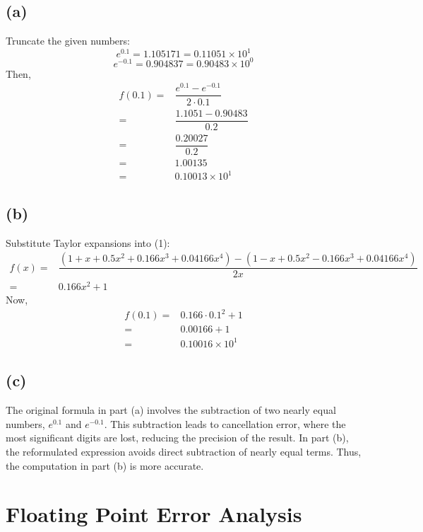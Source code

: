 \documentclass{article}
\begin{document}
\subsection*{(a)}
Truncate the given numbers:
$$
    e^{0.1} = 1.105171 = 0.11051 \times 10^1
$$
$$
    e^{-0.1} = 0.904837 = 0.90483 \times 10^0
$$
Then,
\begin{equation*}
    \begin{aligned}
        f(0.1) = & \dfrac{e^{0.1} - e^{-0.1}}{2 \cdot 0.1} \\
        =        & \dfrac{1.1051-0.90483}{0.2}             \\
        =        & \dfrac{0.20027}{0.2}                    \\
        =        & 1.00135                                 \\
        =        & \boxed{0.10013 \times 10^1}
    \end{aligned}
\end{equation*}

\subsection*{(b)}
Substitute Taylor expansions into (1):
$$
    \begin{aligned}
        f(x) = & \dfrac{(1 + x + 0.5x^2 + 0.166x^3 + 0.04166x^4)-(1 - x +0.5x^2 -0.166x^3+0.04166x^4)}{2x} \\
        =      & 0.166 x^2 + 1
    \end{aligned}
$$
Now,
$$
    \begin{aligned}
        f(0.1) = & 0.166 \cdot 0.1^2 + 1       \\
        =        & 0.00166+1                   \\
        =        & \boxed{0.10016 \times 10^1}
    \end{aligned}
$$

\subsection*{(c)}
The original formula in part (a) involves the subtraction of two nearly equal numbers, $e^{0.1}$ and $e^{-0.1}$. This subtraction leads to cancellation error, where the most significant digits are lost, reducing the precision of the result. In part (b), the reformulated expression avoids direct subtraction of nearly equal terms. Thus, the computation in part (b) is more accurate.

\newpage
\section{Floating Point Error Analysis}
\end{document}
